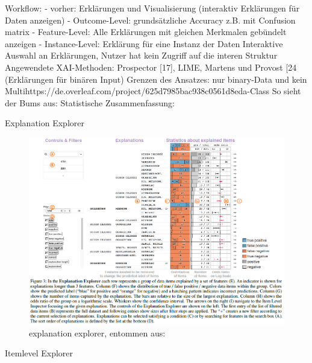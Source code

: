 Workflow: - vorher: Erklärungen und Visualisierung (interaktiv Erklärungen für Daten anzeigen) - Outcome-Level: grundsätzliche Accuracy z.B. mit Confusion matrix - Feature-Level: Alle Erklärungen mit gleichen Merkmalen gebündelt anzeigen - Instance-Level: Erklärung für eine Instanz der Daten  Interaktive Auswahl an Erklärungen, Nutzer hat kein Zugriff auf die interen Struktur
Angewendete XAI-Methoden: Prospector [17], LIME, Martens und Provost [24 (Erklärungen für binären Input)
Grenzen des Ansatzes: nur binary-Data und kein Multihttps://de.overleaf.com/project/625d7985bac938c0561d8eda-Class
So sieht der Bums aus:
Statistische Zusammenfassung:

Explanation Explorer
\begin{figure}
    \centering
    \includegraphics[scale=0.45]{pic/MA-Bilder/Literaturrecherche/25-explanationexplorer.PNG}
    \caption{explanation explorer, entommen aus: \cite{krause2017workflow}}
    \label{Fig:Krause-explanationExplorer}
\end{figure}
Itemlevel Explorer
